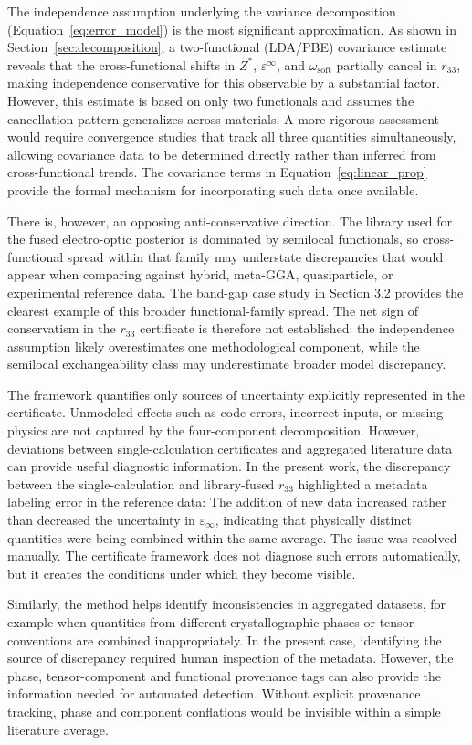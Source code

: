 \documentclass[twocolumn,superscriptaddress,amsmath,amssymb,longbibliography]{revtex4-2}
\begin{document}
The independence assumption underlying the variance decomposition
(Equation~\ref{eq:error_model}) is the most significant approximation. As shown
in Section~\ref{sec:decomposition}, a two-functional (LDA/PBE) covariance
estimate reveals that the cross-functional shifts in $Z^*$,
$\varepsilon^\infty$, and $\omega_{\mathrm{soft}}$ partially cancel in
$r_{33}$, making independence conservative for this observable by a
substantial factor. However, this estimate is based on only two functionals
and assumes the cancellation pattern generalizes across materials. A more rigorous assessment would require convergence studies that track all three quantities simultaneously, allowing covariance data to be determined directly rather than inferred from cross-functional trends.
 The covariance terms in
Equation~\ref{eq:linear_prop} provide the formal mechanism for incorporating
such data once available.

There is, however, an opposing anti-conservative direction. The library used
for the fused electro-optic posterior is dominated by semilocal functionals, so
cross-functional spread within that family may understate discrepancies that
would appear when comparing against hybrid, meta-GGA, quasiparticle, or
experimental reference data. The band-gap case study in Section 3.2 provides the clearest example of this broader functional-family
spread. The net sign of conservatism in the $r_{33}$ certificate is therefore
not established: the independence assumption likely overestimates one
methodological component, while the semilocal exchangeability class may
underestimate broader model discrepancy.

The framework quantifies only sources of uncertainty explicitly represented in the certificate. Unmodeled
effects such as code errors, incorrect inputs, or missing physics are not
captured by the four-component decomposition. However, deviations between
single-calculation certificates and aggregated literature data can provide useful diagnostic information. In the present work,  the discrepancy between the single-calculation and
library-fused $r_{33}$ highlighted a metadata labeling error in the reference data:  The addition of new data increased rather than decreased the uncertainty in $\varepsilon_\infty$, indicating that physically distinct quantities were being combined within the same average. The issue was resolved manually. The certificate framework does not diagnose such
errors automatically, but it creates the conditions under which they
become visible.

Similarly, the method helps identify  inconsistencies in aggregated datasets, for example when quantities from different crystallographic phases or tensor conventions are combined inappropriately. In the present case, identifying the source of discrepancy required human inspection of the metadata. However, the phase, tensor-component and functional provenance tags can also provide the information needed for automated detection. Without explicit provenance tracking, phase and component conflations would be invisible within a simple literature average.
\end{document}
